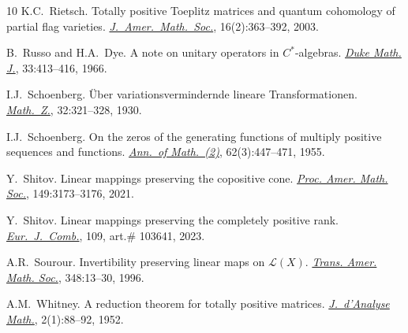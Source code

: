\documentclass[11pt,reqno]{amsart}
\theoremstyle{plain}
\theoremstyle{definition}
\numberwithin{equation}{section}
\begin{document}
\begin{thebibliography}{10}
		K.C.~Rietsch.
		\newblock Totally positive {T}oeplitz matrices and quantum cohomology of partial flag varieties.
		\newblock \href{http://dx.doi.org/10.1090/S0894-0347-02-00412-5}%
		{\em J.\ Amer.\ Math.\ Soc.}, 16(2):363--392, 2003.
		
		B.~Russo and H.A.~Dye.
		\newblock A note on unitary operators in $C^*$-algebras.
		\newblock \href{https://projecteuclid.org/journals/duke-mathematical-journal/volume-33/issue-2/A-note-on-unitary-operators-in-C-algebras/10.1215/S0012-7094-66-03346-1.short}
		{\em Duke Math. J.}, 33:413--416, 1966. 
		
		I.J.~Schoenberg.
		\newblock \"{U}ber variationsvermindernde lineare {T}ransformationen.
		\newblock \href{http://dx.doi.org/10.1007/BF01194637}{\em Math.\ Z.},
		32:321--328, 1930.
		
		
		I.J.~Schoenberg.
		\newblock On the zeros of the generating functions of multiply positive
		sequences and functions.
		\newblock \href{http://dx.doi.org/10.2307/1970073}{\em Ann.\ of Math.\ (2)}, 62(3):447--471, 1955.
		
		
		Y.~Shitov.
		\newblock Linear mappings preserving the copositive cone.
		\newblock \href{https://doi.org/10.1090/proc/15432}
		{\em Proc. Amer. Math. Soc.}, 149:3173--3176, 2021.
		
		Y.~Shitov.
		\newblock Linear mappings preserving the completely positive rank.
		\newblock \href{https://doi.org/10.1016/j.ejc.2022.103641}
		{\em Eur.\ J.\ Comb.}, 109, art.\# 103641, 2023.
		
		A.R.~Sourour.
		\newblock Invertibility preserving linear maps on $\mathcal{L}(X)$.
		\newblock \href{https://www.ams.org/journals/tran/1996-348-01/S0002-9947-96-01428-6/}
		{\em Trans. Amer. Math. Soc.}, 348:13--30, 1996. 
		
		A.M.~Whitney.
		\newblock A reduction theorem for totally positive matrices.
		\newblock \href{http://dx.doi.org/10.1007/BF02786969}
		{\em J.\ d'Analyse Math.}, 2(1):88--92, 1952.
		
	\end{thebibliography}
\end{document}
